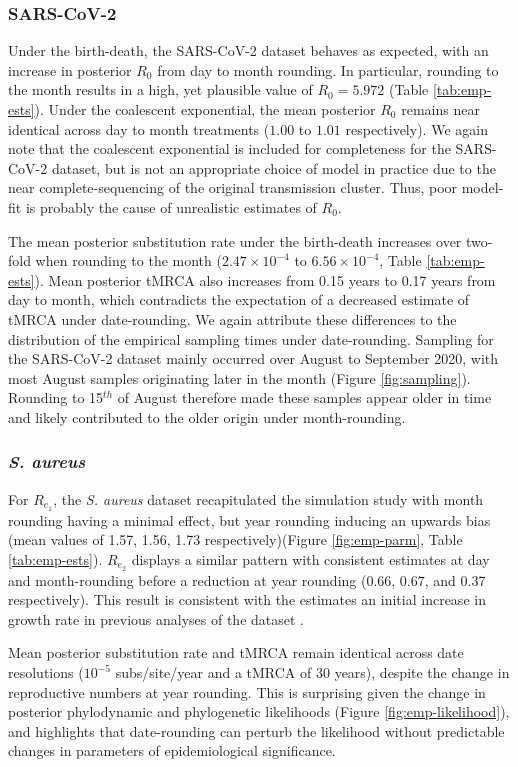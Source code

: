 \documentclass[12pt]{article}
\begin{document}
\begin{spacing}{2}
\subsubsection*{SARS-CoV-2}
Under the birth-death, the SARS-CoV-2 dataset behaves as expected, with an increase in posterior $R_0$ from day to month rounding. In particular, rounding to the month results in a high, yet plausible value of $R_0 = 5.972$ (Table \ref{tab:emp-ests}). Under the coalescent exponential, the mean posterior $R_0$ remains near identical across day to month treatments ($1.00$ to $1.01$ respectively). We again note that the coalescent exponential is included for completeness for the SARS-CoV-2 dataset, but is not an appropriate choice of model in practice due to the near complete-sequencing of the original transmission cluster. Thus, poor model-fit is probably the cause of unrealistic estimates of $R_0$.

The mean posterior substitution rate under the birth-death increases over two-fold when rounding to the month ($2.47\times10^{-4}$ to $6.56\times10^{-4}$, Table \ref{tab:emp-ests}). Mean posterior tMRCA also increases from 0.15 years to 0.17 years from day to month, which contradicts the expectation of a decreased estimate of tMRCA under date-rounding. We again attribute these differences to the distribution of the empirical sampling times under date-rounding. Sampling for the SARS-CoV-2 dataset mainly occurred over August to September 2020, with most August samples originating later in the month (Figure \ref{fig:sampling}). Rounding to 15$^{th}$ of August therefore made these samples appear older in time and likely contributed to the older origin under month-rounding.

\subsubsection*{\textit{S. aureus}}
For $R_{e_1}$, the \textit{S. aureus} dataset recapitulated the simulation study with month rounding having a minimal effect, but year rounding inducing an upwards bias (mean values of 1.57, 1.56, 1.73 respectively)(Figure \ref{fig:emp-parm}, Table \ref{tab:emp-ests}). $R_{e_2}$ displays a similar pattern with consistent estimates at day and month-rounding before a reduction at year rounding (0.66, 0.67, and 0.37 respectively). This result is consistent with the estimates an initial increase in growth rate in previous analyses of the dataset \cite{volz_modeling_2018}.

Mean posterior substitution rate and tMRCA remain identical across date resolutions ($10^{-5}$ subs/site/year and a tMRCA of 30 years), despite the change in reproductive numbers at year rounding. This is surprising given the change in posterior phylodynamic and phylogenetic likelihoods (Figure \ref{fig:emp-likelihood}), and highlights that date-rounding can perturb the likelihood without predictable changes in parameters of epidemiological significance.


\end{spacing}
\end{document}
